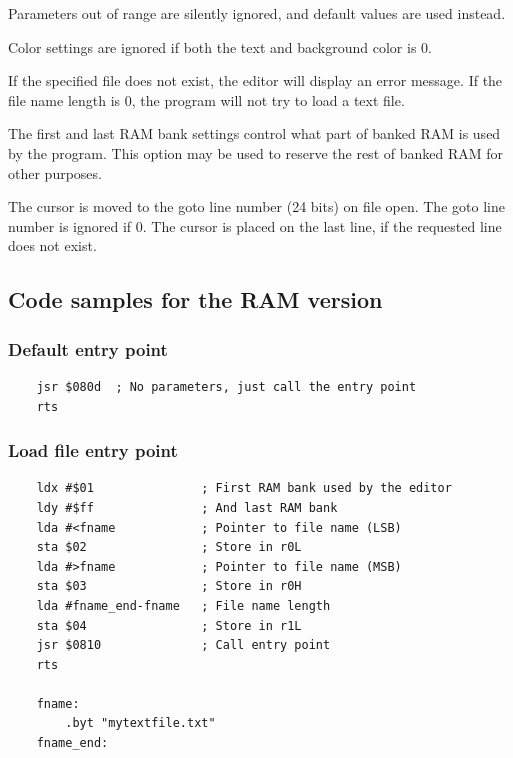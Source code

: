 \documentclass{article}
\begin{document}
        Parameters out of range are silently ignored, and default
        values are used instead.

        Color settings are ignored if both the text and background color is 0.

        If the specified file does not exist, the editor will display an
        error message. If the file name length is 0, the program will not try
        to load a text file.

        The first and last RAM bank settings control what part of banked RAM is
        used by the program. This option may be used to reserve the rest of banked RAM
        for other purposes.

        The cursor is moved to the goto line number (24 bits) on file open. The goto
        line number is ignored if 0. The cursor is placed on the last line, if
        the requested line does not exist.

    \subsection{Code samples for the RAM version}

    \subsubsection{Default entry point}
\begin{verbatim}
    jsr $080d  ; No parameters, just call the entry point
    rts
\end{verbatim}

    \subsubsection{Load file entry point}
\begin{verbatim}
    ldx #$01               ; First RAM bank used by the editor
    ldy #$ff               ; And last RAM bank
    lda #<fname            ; Pointer to file name (LSB)
    sta $02                ; Store in r0L
    lda #>fname            ; Pointer to file name (MSB)
    sta $03                ; Store in r0H
    lda #fname_end-fname   ; File name length
    sta $04                ; Store in r1L
    jsr $0810              ; Call entry point
    rts

    fname:
        .byt "mytextfile.txt"
    fname_end:
\end{verbatim}
\end{document}
